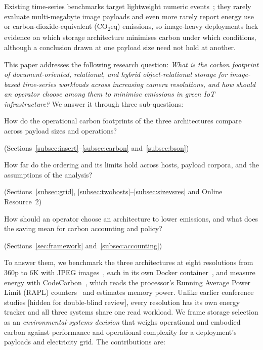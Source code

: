 \documentclass[pdflatex,sn-basic]{sn-jnl}%
\begin{document}
{\color{markup}Existing time-series benchmarks target lightweight numeric events~\citep{tsbs,cratedb_ts_benchmark,diva_timescaledb_mongodb_eval}; they rarely evaluate multi-megabyte image payloads and even more rarely report energy use or carbon-dioxide-equivalent (CO\textsubscript{2}eq) emissions, so image-heavy deployments lack evidence on which storage architecture minimises carbon under which conditions, although a conclusion drawn at one payload size need not hold at another.}

{\color{markup}This paper addresses the following research question: \emph{What is the carbon footprint of document-oriented, relational, and hybrid object-relational storage for image-based time-series workloads across increasing camera resolutions, and how should an operator choose among them to minimise emissions in green IoT infrastructure?} We answer it through three sub-questions:}
\begin{itemize}
{\color{markup}  \item[RQ1] How do the operational carbon footprints of the three architectures compare across payload sizes and operations?} {\color{markup}(Sections~\ref{subsec:insert}--\ref{subsec:carbon} and~\ref{subsec:bson})}
{\color{markup}  \item[RQ2] How far do the ordering and its limits hold across hosts, payload corpora, and the assumptions of the analysis?} {\color{markup}(Sections~\ref{subsec:grid}, \ref{subsec:twohosts}--\ref{subsec:sizevsres} and Online Resource~2)}
{\color{markup}  \item[RQ3] How should an operator choose an architecture to lower emissions, and what does the saving mean for carbon accounting and policy?} {\color{markup}(Sections~\ref{sec:framework} and~\ref{subsec:accounting})}
\end{itemize}
{\color{markup}To answer them, we benchmark the three architectures at eight resolutions from 360p to 6K with JPEG images~\citep{wallace_jpeg}, each in its own Docker container~\citep{docker_official}, and measure energy with CodeCarbon~\citep{codecarbon}, which reads the processor's Running Average Power Limit (RAPL) counters~\citep{david_rapl} and estimates memory power.} {\color{markup}Unlike earlier conference studies [hidden for double-blind review], every resolution has its own energy tracker and all three systems share one read workload.} {\color{markup}We frame storage selection as an \emph{environmental-systems decision} that weighs operational and embodied carbon against performance and operational complexity for a deployment's payloads and electricity grid.} {\color{markup}The contributions are:}
\end{document}
